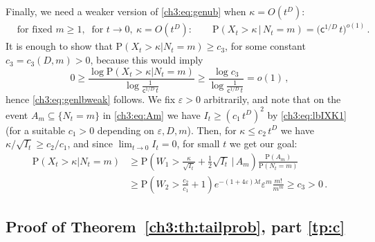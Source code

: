 \documentclass[a4paper,reqno,11pt]{amsart}
\numberwithin{equation}{section}
\newcommand{\PEfont}{\mathrm}
\renewcommand{\P}{\ensuremath{\PEfont P}}
\renewcommand{\epsilon}{\varepsilon}
\newcommand\sfc{\mathsf{c}}
\begin{document}
Finally, we need a weaker version of \eqref{ch3:eq:genub} when $\kappa = O(t^D)$:
\begin{equation} \label{ch3:eq:genlbweak}
\begin{split}
	&\text{for fixed } m \ge 1, \ \text{ for } t \to 0, \ \kappa = O(t^D):
	\qquad \P(X_t >\kappa \,|\, N_t=m) =
	\big( \sfc^{1/D} \, t \big)^{o(1)} \,.
\end{split}
\end{equation}
It is enough to show that $\P( X_t >\kappa  | N_t = m) \ge c_3$,
for some constant $c_3 = c_3(D,m) > 0$, because this would imply
\begin{equation*}
	0 \ge \frac{\log \P( X_t >\kappa  | N_t = m)}{\log \frac{1}{\sfc^{1/D} \, t}}
	\ge \frac{\log c_3}{\log \frac{1}{\sfc^{1/D} \, t}} = o(1) \,,
\end{equation*}
hence \eqref{ch3:eq:genlbweak} follows.
We fix $\epsilon > 0$ arbitrarily, and note that
on the event $A_m \subseteq \{N_t = m\}$ in \eqref{ch3:eq:Am} we have $I_t \ge (c_1 \, t^{D})^2$
by \eqref{ch3:eq:lbIXK1}
(for a suitable $c_1 > 0$ depending on $\epsilon, D, m$). Then, for $\kappa \le c_2 \, t^D$ we have
$\kappa / \sqrt{I_t} \ge c_2/c_1$, and since $\lim_{t\to 0} I_t = 0$,
for small $t$ we get our goal:
\begin{equation*}
\begin{split}
	\P( X_t >\kappa  | N_t = m) & \ge
	\P\left(W_1 > \frac{\kappa}{\sqrt{I_t}} + \frac{1}{2} \sqrt{I_t} 
	\,\bigg|\, A_m \right) \frac{\P(A_m)}{\P(N_t=m)} \\
	& \ge \P\left(W_2 > \frac{c_2}{c_1} + 1 \right)
	e^{-(1+4\epsilon)\lambda t} \epsilon^m \frac{m!}{m^m} \ge c_3 > 0 \,.
\end{split}
\end{equation*}


\subsection{Proof of Theorem~\ref{ch3:th:tailprob}, part \eqref{tp:c}}
\end{document}
